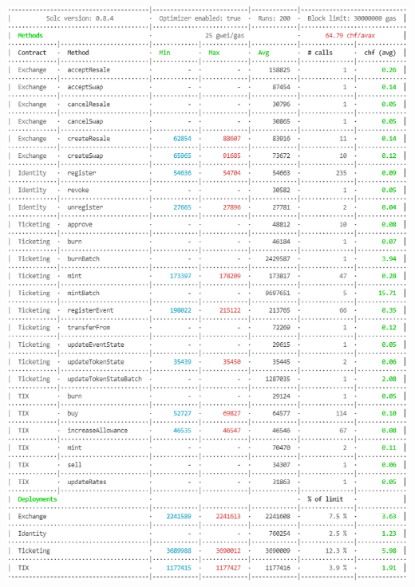 \documentclass[a4paper,11pt,oneside]{report}
\begin{document}
\includegraphics[width=\textwidth]{marketplace_price_avalanche_01_02_2022.PNG}
\end{document}
